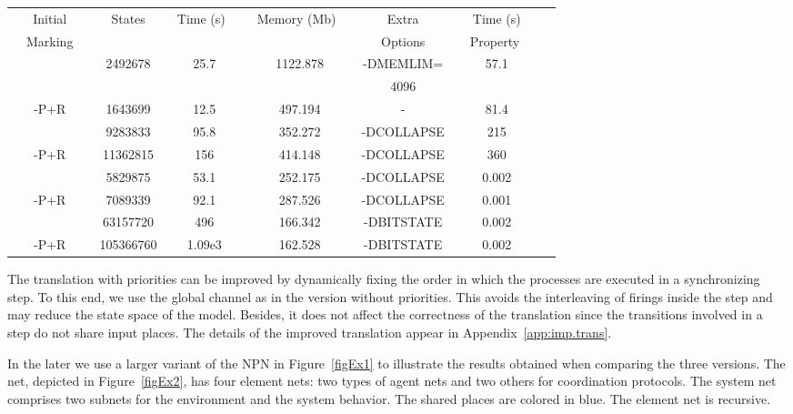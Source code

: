 \documentclass{llncs}
\begin{document}
\vspace{10pt}
\begin{center}\begin{tabular}{|c|c|c|c|c|c|c|}
      \hline
      \ \ Initial\ \  &\ \ States\ \ &\ Time (s)\ \ &\ Memory (Mb)\ \ &\ Extra\ &\ \ Time (s)\ \ \\
      \ \ Marking\ \  &\ \ \ \ &\ \ \ &\ \ \ &\ Options\ &\ \ Property \ \ \\
      \hline
        & 2492678  & 25.7 & 1122.878 &  -DMEMLIM=  &  57.1 \\
             &          &      &          &      4096   &    \\
      \hline
      -P+R        & 1643699  & 12.5 & 497.194 & - & 81.4  \\
      \hline
       & 9283833  & 95.8 &   352.272 & -DCOLLAPSE &  215 \\
      \hline
      -P+R       & 11362815  & 156 &   414.148   & -DCOLLAPSE &  360 \\
      \hline
       & 5829875  & 53.1 &   252.175 & -DCOLLAPSE &   0.002 \\
      \hline
      -P+R      & 7089339  &  92.1 & 287.526 & -DCOLLAPSE & 0.001 \\
      \hline
       & 63157720  & 496 & 166.342 & -DBITSTATE & 0.002 \\ \hline
      -P+R        &  105366760  & 1.09e3 & 162.528 & -DBITSTATE & 0.002 \\ \hline
\end{tabular}\end{center}
\vspace{10pt}

The translation with priorities can be improved by dynamically fixing the order in which the processes are executed in a synchronizing step. To this end, we  use the global channel as in the version without priorities. This avoids the interleaving of firings inside the step and may reduce the state space of the model. Besides, it does not affect the correctness of the translation since the  transitions involved in a step do not share input places. The details of the improved translation appear in Appendix~\ref{app:imp.trans}.

In the later we use a larger variant of the NPN in Figure~\ref{figEx1} to illustrate the results obtained when comparing the three versions. The net, depicted in Figure~\ref{figEx2}, has four element nets: two types of agent nets and two others for coordination protocols. The system net comprises two subnets for the environment and the system behavior. The shared places are colored in blue. The element net  is recursive.
\end{document}

